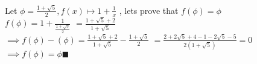 \documentclass{article}
\begin{document}
\noindent Let $\phi = \frac{1+\sqrt{5}}{2},
f(x) \mapsto 1 + \frac{1}{x}$ , lets prove that
$ f(\phi) = \phi$\\
$ f(\phi) = 1 + \frac{1}{\frac{1+\sqrt{5}}{2}}$
$ = \frac{1+\sqrt{5}+2}{1+\sqrt{5}} $\\
$\implies f(\phi) - (\phi) = \frac{1+\sqrt{5}+2}{1+\sqrt{5}} -
\frac{1+\sqrt{5}}{2} $
$ = \frac{2+2\sqrt{5}+4-1-2\sqrt{5}-5}{2(1+\sqrt{5})} = 0 $\\
$\implies f(\phi) = \phi \blacksquare $
\end{document}
